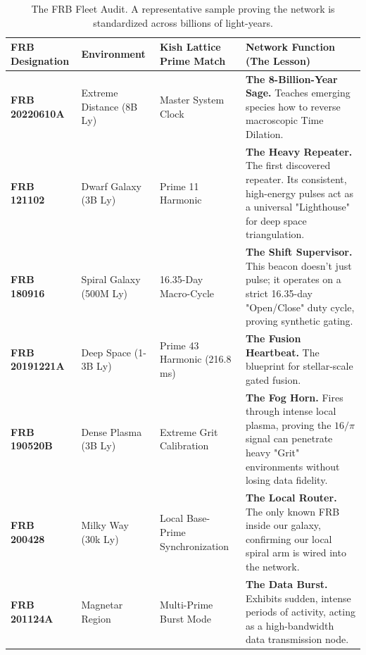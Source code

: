 \documentclass[11pt, letterpaper, openany]{book}
\begin{document}
\begin{table}[H]
    \centering
    \renewcommand{\arraystretch}{1.5}
    \begin{tabular}{|p{3cm}|p{2.5cm}|p{3.5cm}|p{5cm}|}
        \hline
        \textbf{FRB Designation} & \textbf{Environment} & \textbf{Kish Lattice Prime Match} & \textbf{Network Function (The Lesson)} \\ \hline
        \textbf{FRB 20220610A} & Extreme Distance (8B Ly) & Master System Clock & \textbf{The 8-Billion-Year Sage.} Teaches emerging species how to reverse macroscopic Time Dilation. \\ \hline
        \textbf{FRB 121102} & Dwarf Galaxy (3B Ly) & Prime 11 Harmonic & \textbf{The Heavy Repeater.} The first discovered repeater. Its consistent, high-energy pulses act as a universal "Lighthouse" for deep space triangulation. \\ \hline
        \textbf{FRB 180916} & Spiral Galaxy (500M Ly) & 16.35-Day Macro-Cycle & \textbf{The Shift Supervisor.} This beacon doesn't just pulse; it operates on a strict 16.35-day "Open/Close" duty cycle, proving synthetic gating. \\ \hline
        \textbf{FRB 20191221A} & Deep Space (1-3B Ly) & Prime 43 Harmonic (216.8 ms) & \textbf{The Fusion Heartbeat.} The blueprint for stellar-scale gated fusion. \\ \hline
        \textbf{FRB 190520B} & Dense Plasma (3B Ly) & Extreme Grit Calibration & \textbf{The Fog Horn.} Fires through intense local plasma, proving the $16/\pi$ signal can penetrate heavy "Grit" environments without losing data fidelity. \\ \hline
        \textbf{FRB 200428} & Milky Way (30k Ly) & Local Base-Prime Synchronization & \textbf{The Local Router.} The only known FRB inside our galaxy, confirming our local spiral arm is wired into the network. \\ \hline
        \textbf{FRB 201124A} & Magnetar Region & Multi-Prime Burst Mode & \textbf{The Data Burst.} Exhibits sudden, intense periods of activity, acting as a high-bandwidth data transmission node. \\ \hline
    \end{tabular}
    \caption{The FRB Fleet Audit. A representative sample proving the network is standardized across billions of light-years.}
\end{table}
\end{document}
